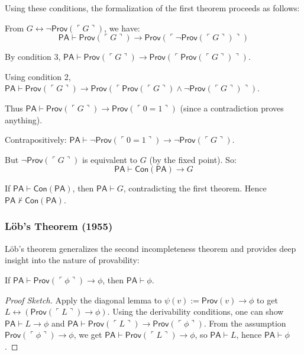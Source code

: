 Using these conditions, the formalization of the first theorem proceeds as follows:

From $G \leftrightarrow \neg \mathsf{Prov}(\ulcorner G \urcorner)$, we have:
\[
\mathsf{PA} \vdash \mathsf{Prov}(\ulcorner G \urcorner) \to \mathsf{Prov}(\ulcorner \neg \mathsf{Prov}(\ulcorner G \urcorner) \urcorner)
\]

By condition 3, $\mathsf{PA} \vdash \mathsf{Prov}(\ulcorner G \urcorner) \to \mathsf{Prov}(\ulcorner \mathsf{Prov}(\ulcorner G \urcorner) \urcorner)$.

Using condition 2, $\mathsf{PA} \vdash \mathsf{Prov}(\ulcorner G \urcorner) \to \mathsf{Prov}(\ulcorner \mathsf{Prov}(\ulcorner G \urcorner) \land \neg \mathsf{Prov}(\ulcorner G \urcorner) \urcorner)$.

Thus $\mathsf{PA} \vdash \mathsf{Prov}(\ulcorner G \urcorner) \to \mathsf{Prov}(\ulcorner 0=1 \urcorner)$ (since a contradiction proves anything).

Contrapositively: $\mathsf{PA} \vdash \neg \mathsf{Prov}(\ulcorner 0=1 \urcorner) \to \neg \mathsf{Prov}(\ulcorner G \urcorner)$.

But $\neg \mathsf{Prov}(\ulcorner G \urcorner)$ is equivalent to $G$ (by the fixed point). So:
\[
\mathsf{PA} \vdash \mathsf{Con}(\mathsf{PA}) \to G
\]

If $\mathsf{PA} \vdash \mathsf{Con}(\mathsf{PA})$, then $\mathsf{PA} \vdash G$, contradicting the first theorem. Hence $\mathsf{PA} \nvdash \mathsf{Con}(\mathsf{PA})$.

\subsubsection*{Löb's Theorem (1955)}

Löb's theorem generalizes the second incompleteness theorem and provides deep insight into the nature of provability:

\begin{theorem}
If $\mathsf{PA} \vdash \mathsf{Prov}(\ulcorner \phi \urcorner) \to \phi$, then $\mathsf{PA} \vdash \phi$.
\end{theorem}

\begin{proof}[Proof Sketch]
Apply the diagonal lemma to $\psi(v) := \mathsf{Prov}(v) \to \phi$ to get $L \leftrightarrow (\mathsf{Prov}(\ulcorner L \urcorner) \to \phi)$. Using the derivability conditions, one can show $\mathsf{PA} \vdash L \to \phi$ and $\mathsf{PA} \vdash \mathsf{Prov}(\ulcorner L \urcorner) \to \mathsf{Prov}(\ulcorner \phi \urcorner)$. From the assumption $\mathsf{Prov}(\ulcorner \phi \urcorner) \to \phi$, we get $\mathsf{PA} \vdash \mathsf{Prov}(\ulcorner L \urcorner) \to \phi$, so $\mathsf{PA} \vdash L$, hence $\mathsf{PA} \vdash \phi$.
\end{proof}

